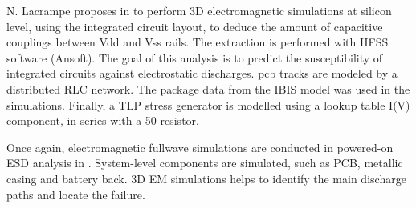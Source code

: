 N. Lacrampe proposes in \cite{LacrampeTransientImmunity} to perform 3D electromagnetic simulations at silicon level, using the integrated circuit layout, to deduce the amount of capacitive couplings between Vdd and Vss rails.
The extraction is performed with HFSS software (Ansoft).
The goal of this analysis is to predict the susceptibility of integrated circuits against electrostatic discharges.
\gls{pcb} tracks are modeled by a distributed RLC network.
The package data from the IBIS model \cite{ibis-spec} was used in the simulations.
Finally, a TLP stress generator is modelled using a lookup table I(V) component, in series with a 50\textOmega{} resistor.

Once again, electromagnetic fullwave simulations are conducted in powered-on ESD analysis in \cite{softFailMobile}.
System-level components are simulated, such as PCB, metallic casing and battery back.
3D EM simulations helps to identify the main discharge paths and locate the failure.
